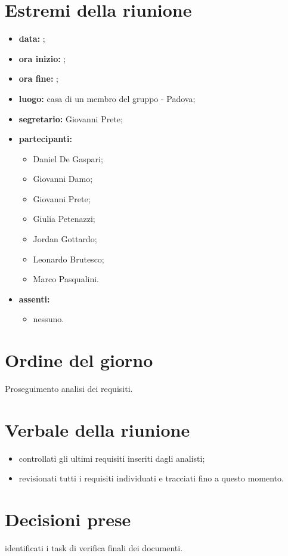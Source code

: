 \documentclass[a4paper,11pt]{article}
\begin{document}
	\section{Estremi della riunione}
	\begin{itemize}
		\item \textbf{data:} ;
		\item \textbf{ora inizio:} ;
		\item \textbf{ora fine:} ;
		\item \textbf{luogo:} casa di un membro del gruppo - Padova;
		\item \textbf{segretario:} Giovanni Prete;
		\item \textbf{partecipanti:}
			\begin{itemize}
				\item Daniel De Gaspari;
				\item Giovanni Damo;
				\item Giovanni Prete;
				\item Giulia Petenazzi;
				\item Jordan Gottardo;
				\item Leonardo Brutesco;
				\item Marco Pasqualini.
			\end{itemize}
		\item \textbf{assenti:}
			\begin{itemize}
			 \item nessuno.
			\end{itemize}
	\end{itemize}
	\section{Ordine del giorno}
		Proseguimento analisi dei requisiti.
	\section{Verbale della riunione}
		\begin{itemize}
			\item controllati gli ultimi requisiti inseriti dagli analisti;
			\item revisionati tutti i requisiti individuati e tracciati fino a questo momento.
		\end{itemize}
	\section{Decisioni prese}
		\begin{itemize}
			\itemVI identificati i task di verifica finali dei documenti.
		\end{itemize}
\end{document}
